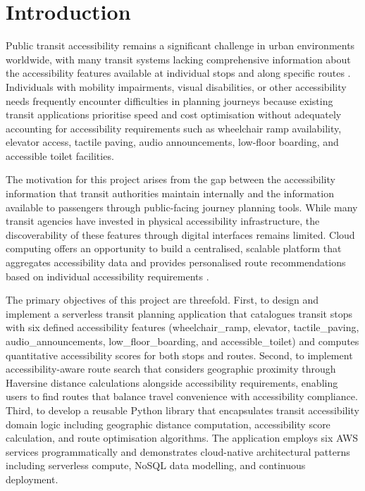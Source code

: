 \documentclass[conference]{IEEEtran}
\begin{document}
\section{Introduction}

Public transit accessibility remains a significant challenge in urban environments worldwide, with many transit systems lacking comprehensive information about the accessibility features available at individual stops and along specific routes \cite{cloudpatterns}. Individuals with mobility impairments, visual disabilities, or other accessibility needs frequently encounter difficulties in planning journeys because existing transit applications prioritise speed and cost optimisation without adequately accounting for accessibility requirements such as wheelchair ramp availability, elevator access, tactile paving, audio announcements, low-floor boarding, and accessible toilet facilities.

The motivation for this project arises from the gap between the accessibility information that transit authorities maintain internally and the information available to passengers through public-facing journey planning tools. While many transit agencies have invested in physical accessibility infrastructure, the discoverability of these features through digital interfaces remains limited. Cloud computing offers an opportunity to build a centralised, scalable platform that aggregates accessibility data and provides personalised route recommendations based on individual accessibility requirements \cite{serverless}.

The primary objectives of this project are threefold. First, to design and implement a serverless transit planning application that catalogues transit stops with six defined accessibility features (wheelchair\_ramp, elevator, tactile\_paving, audio\_announcements, low\_floor\_boarding, and accessible\_toilet) and computes quantitative accessibility scores for both stops and routes. Second, to implement accessibility-aware route search that considers geographic proximity through Haversine distance calculations alongside accessibility requirements, enabling users to find routes that balance travel convenience with accessibility compliance. Third, to develop a reusable Python library that encapsulates transit accessibility domain logic including geographic distance computation, accessibility score calculation, and route optimisation algorithms. The application employs six AWS services programmatically and demonstrates cloud-native architectural patterns including serverless compute, NoSQL data modelling, and continuous deployment.
\end{document}
